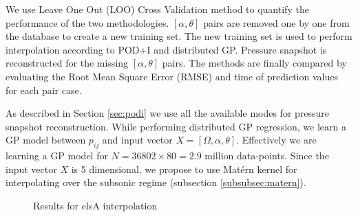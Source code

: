 We use Leave One Out (LOO) Cross Validation method to quantify the performance of the two methodologies. $[\alpha, \theta]$ pairs are removed one by one from the database to create a new training set. The new training set is used to perform interpolation according to POD+I and distributed GP. Pressure snapshot is reconstructed for the missing $[\alpha, \theta]$ pairs. The methods are finally compared by evaluating the Root Mean Square Error (RMSE) and time of prediction values for each pair case. 

As described in Section \ref{sec:podi} we use all the available modes for pressure snapshot reconstruction. While performing distributed GP regression, we learn a GP model between \(p_{ij}\) and input vector \(X = [\Omega, \alpha, \theta]\). Effectively we are learning a GP model for \(N = 36802\times80 = 2.9\) million data-points. Since the input vector \(X\) is 5 dimensional, we propose to use Mat\'ern kernel for interpolating over the subsonic regime (subsection \ref{subsubsec:matern}).  

\begin{figure}[!ht]
  \centering
  \quad
  \caption{Results for elsA interpolation}
\end{figure}

